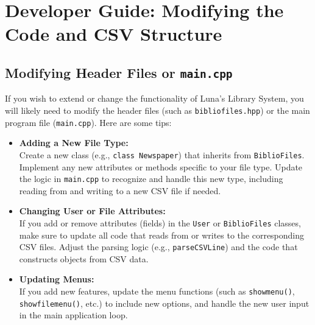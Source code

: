 \documentclass[a4paper,12pt]{article}
\begin{document}
\section{Developer Guide: Modifying the Code and CSV Structure}

\subsection{Modifying Header Files or \texttt{main.cpp}}
If you wish to extend or change the functionality of Luna's Library System, you will likely need to modify the header files (such as \texttt{bibliofiles.hpp}) or the main program file (\texttt{main.cpp}). Here are some tips:

\begin{itemize}
    \item \textbf{Adding a New File Type:} \\
    Create a new class (e.g., \texttt{class Newspaper}) that inherits from \texttt{BiblioFiles}. Implement any new attributes or methods specific to your file type. Update the logic in \texttt{main.cpp} to recognize and handle this new type, including reading from and writing to a new CSV file if needed.
    \item \textbf{Changing User or File Attributes:} \\
    If you add or remove attributes (fields) in the \texttt{User} or \texttt{BiblioFiles} classes, make sure to update all code that reads from or writes to the corresponding CSV files. Adjust the parsing logic (e.g., \texttt{parseCSVLine}) and the code that constructs objects from CSV data.
    \item \textbf{Updating Menus:} \\
    If you add new features, update the menu functions (such as \texttt{showmenu()}, \texttt{showfilemenu()}, etc.) to include new options, and handle the new user input in the main application loop.
\end{itemize}
\end{document}
